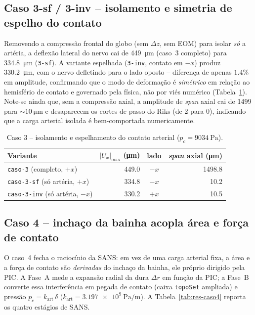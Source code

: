 \subsection*{Caso 3-sf / 3-inv -- isolamento e simetria de espelho do contato}
\label{sec:res-caso3sf}

Removendo a compressão frontal do globo (sem $\Delta z$, sem EOM) para isolar \emph{só} a artéria, a deflexão lateral do nervo cai de \SI{449}{\micro\meter} (caso~3 completo) para \SI{334.8}{\micro\meter} (\texttt{3-sf}). A variante espelhada (\texttt{3-inv}, contato em $-x$) produz \SI{330.2}{\micro\meter}, com o nervo defletindo para o lado oposto -- diferença de apenas $1.4\%$ em amplitude, confirmando que o modo de deformação é \emph{simétrico} em relação ao hemisfério de contato e governado pela física, não por viés numérico (Tabela~\ref{tab:res-caso3sf}). Note-se ainda que, sem a compressão axial, a amplitude de \emph{span} axial cai de \SI{1499}{} para $\sim\SI{10}{\micro\meter}$ e desaparecem os cortes de passo do Riks (de 2 para 0), indicando que a carga arterial isolada é bem-comportada numericamente.

\begin{table}[h!]
\centering
\small
\caption{Caso 3 -- isolamento e espelhamento do contato arterial
($p_c = \SI{9034}{\pascal}$).}
\label{tab:res-caso3sf}
\begin{tabular}{l r c r}
\toprule
\textbf{Variante} & $|U_x|_{\max}$ (\si{\micro\meter}) & lado & \emph{span} axial (\si{\micro\meter}) \\
\midrule
\texttt{caso-3} (completo, $+x$) & 449.0 & $-x$ & 1498.8 \\
\texttt{caso-3-sf} (só artéria, $+x$) & 334.8 & $-x$ & 10.2 \\
\texttt{caso-3-inv} (só artéria, $-x$) & 330.2 & $+x$ & 10.5 \\
\bottomrule
\end{tabular}
\end{table}

\subsection*{Caso 4 -- inchaço da bainha acopla área e força de contato}
\label{sec:res-caso4}

O caso~4 fecha o raciocínio da SANS: em vez de uma carga arterial fixa, a área e a força de contato são \emph{derivadas} do inchaço da bainha, ele próprio dirigido pela PIC. A Fase~A mede a expansão radial da dura $\Delta r$ em função da PIC; a Fase~B converte essa interferência em pegada de contato (caixa \texttt{topoSet} ampliada) e pressão $p_c = k_{\mathrm{art}}\,\delta$ ($k_{\mathrm{art}} = \SI{3.197e9}{\pascal\per\meter}$). A Tabela~\ref{tab:res-caso4} reporta os quatro estágios de SANS.

